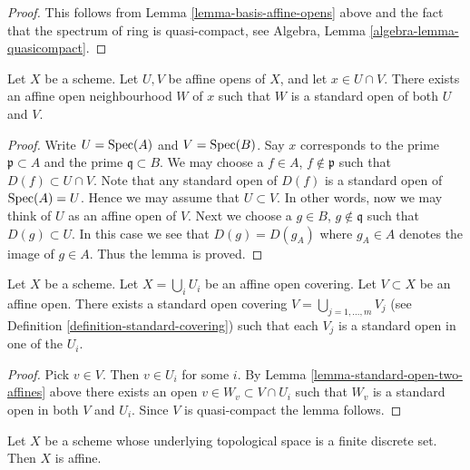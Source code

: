 \begin{proof}
This follows from Lemma \ref{lemma-basis-affine-opens} above
and the fact that the spectrum of ring is quasi-compact, see
Algebra, Lemma \ref{algebra-lemma-quasicompact}.
\end{proof}

\begin{lemma}
\label{lemma-standard-open-two-affines}
Let $X$ be a scheme.
Let $U, V$ be affine opens of $X$, and let $x \in U \cap V$.
There exists an affine open neighbourhood $W$ of $x$
such that $W$ is a standard open of both $U$ and $V$.
\end{lemma}

\begin{proof}
Write $U = \mathop{\rm Spec}(A)$ and $V = \mathop{\rm Spec}(B)$.
Say $x$ corresponds to the prime $\mathfrak p \subset A$
and the prime $\mathfrak q \subset B$.
We may choose a $f \in A$, $f \not \in \mathfrak p$ such that
$D(f) \subset U \cap V$. Note that any standard open of $D(f)$
is a standard open of $\mathop{\rm Spec}(A) = U$. Hence we may assume
that $U \subset V$. In other words, now we may think of $U$
as an affine open of $V$. Next we choose a
$g \in B$, $g \not \in \mathfrak q$ such that
$D(g) \subset U$. In this case we see that $D(g) = D(g_A)$
where $g_A \in A$ denotes the image of $g \in A$. Thus the lemma
is proved.
\end{proof}

\begin{lemma}
\label{lemma-good-subcover}
Let $X$ be a scheme.
Let $X = \bigcup_i U_i$ be an affine open covering.
Let $V \subset X$ be an affine open.
There exists a standard open covering
$V = \bigcup_{j = 1, \ldots, m} V_j$ (see
Definition \ref{definition-standard-covering})
such that each $V_j$ is a standard open in one of the $U_i$.
\end{lemma}

\begin{proof}
Pick $v \in V$. Then $v \in U_i$ for some $i$.
By Lemma \ref{lemma-standard-open-two-affines} above there exists an open
$v \in W_v \subset V \cap U_i$ such that
$W_v$ is a standard open in both $V$ and $U_i$.
Since $V$ is quasi-compact the lemma follows.
\end{proof}

\begin{lemma}
\label{lemma-scheme-finite-discrete-affine}
Let $X$ be a scheme whose underlying topological space
is a finite discrete set.
Then $X$ is affine.
\end{lemma}


